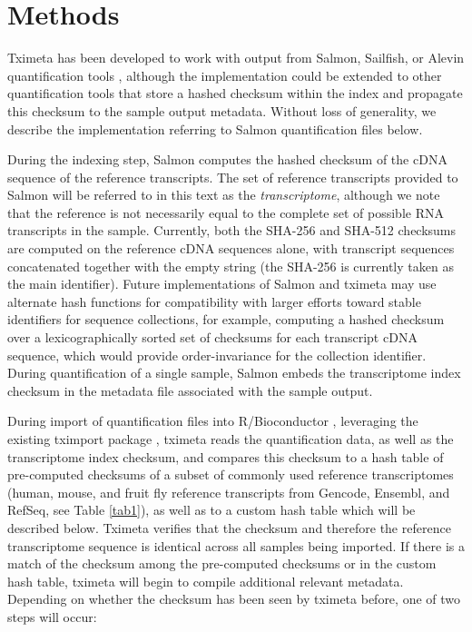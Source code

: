 \documentclass[12pt]{article} \usepackage[utf8]{inputenc}
\begin{document}
\section*{Methods}

Tximeta has been developed to work with output from Salmon, Sailfish,
or Alevin quantification tools \citep{sailfish,salmon,alevin},
although the implementation could be extended to other quantification
tools that store a hashed checksum within the index and propagate this
checksum to the sample output metadata. Without loss of generality, we
describe the implementation referring to Salmon quantification files
below.

During the indexing step, Salmon computes the hashed checksum of the
cDNA sequence of the reference transcripts. The set of reference
transcripts provided to Salmon will be referred to in this text as the
\textit{transcriptome}, although we note that the reference is not
necessarily equal to the complete set of possible RNA transcripts in
the sample. Currently, both the SHA-256 and SHA-512 \citep{sha1}
checksums are computed on the reference cDNA sequences alone, with
transcript sequences concatenated together with the empty string (the
SHA-256 is currently taken as the main identifier). Future
implementations of Salmon and tximeta may use alternate hash functions
for compatibility with larger efforts toward stable identifiers for
sequence collections, for example, computing a hashed checksum over a
lexicographically sorted set of checksums for each transcript cDNA
sequence, which would provide order-invariance for the collection
identifier. During quantification of a single sample, Salmon embeds
the transcriptome index checksum in the metadata file associated with
the sample output.

During import of quantification files into R/Bioconductor
\citep{bioc}, leveraging the existing tximport package
\citep{tximport}, tximeta reads the quantification data, as well as
the transcriptome index checksum, and compares this checksum to a hash
table of pre-computed checksums of a subset of commonly used reference
transcriptomes (human, mouse, and fruit fly reference transcripts from
Gencode, Ensembl, and RefSeq, see Table \ref{tab1}), as well as to a
custom hash table which will be described below. Tximeta verifies that
the checksum and therefore the reference transcriptome sequence is
identical across all samples being imported. If there is a match of
the checksum among the pre-computed checksums or in the custom hash table,
tximeta will begin to compile additional relevant
metadata. Depending on whether the checksum has been seen by tximeta
before, one of two steps will occur:
\end{document}
